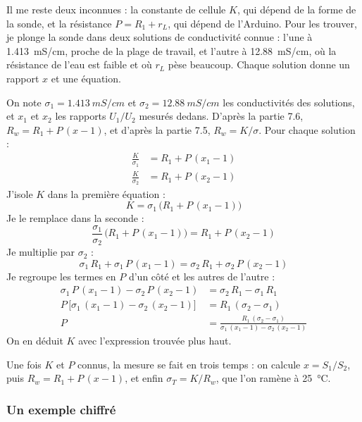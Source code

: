 Il me reste deux inconnues : la constante de cellule $K$, qui dépend de la forme de la sonde, et la résistance $P = R_1 + r_L$, qui dépend de l'Arduino. Pour les trouver, je plonge la sonde dans deux solutions de conductivité connue : l'une à \qty{1,413}{mS/cm}, proche de la plage de travail, et l'autre à \qty{12,88}{mS/cm}, où la résistance de l'eau est faible et où $r_L$ pèse beaucoup. Chaque solution donne un rapport $x$ et une équation.

\begin{demonstration}
On note $\sigma_1 = \qty{1,413}{mS/cm}$ et $\sigma_2 = \qty{12,88}{mS/cm}$ les conductivités des solutions, et $x_1$ et $x_2$ les rapports $U_1/U_2$ mesurés dedans. D'après la partie 7.6, $R_w = R_1 + P\,(x - 1)$, et d'après la partie 7.5, $R_w = K/\sigma$. Pour chaque solution :
\begin{align*}
\frac{K}{\sigma_1} &= R_1 + P\,(x_1 - 1)\\
\frac{K}{\sigma_2} &= R_1 + P\,(x_2 - 1)
\end{align*}
J'isole $K$ dans la première équation :
\[
K = \sigma_1\,\bigl(R_1 + P\,(x_1 - 1)\bigr)
\]
Je le remplace dans la seconde :
\[
\frac{\sigma_1}{\sigma_2}\,\bigl(R_1 + P\,(x_1 - 1)\bigr) = R_1 + P\,(x_2 - 1)
\]
Je multiplie par $\sigma_2$ :
\[
\sigma_1\,R_1 + \sigma_1\,P\,(x_1 - 1) = \sigma_2\,R_1 + \sigma_2\,P\,(x_2 - 1)
\]
Je regroupe les termes en $P$ d'un côté et les autres de l'autre :
\begin{align*}
\sigma_1\,P\,(x_1 - 1) - \sigma_2\,P\,(x_2 - 1) &= \sigma_2\,R_1 - \sigma_1\,R_1\\
P\,\bigl[\sigma_1\,(x_1 - 1) - \sigma_2\,(x_2 - 1)\bigr] &= R_1\,(\sigma_2 - \sigma_1)\\
P &= \frac{R_1\,(\sigma_2 - \sigma_1)}{\sigma_1\,(x_1 - 1) - \sigma_2\,(x_2 - 1)}
\end{align*}
On en déduit $K$ avec l'expression trouvée plus haut.
\end{demonstration}

Une fois $K$ et $P$ connus, la mesure se fait en trois temps : on calcule $x = S_1/S_2$, puis $R_w = R_1 + P\,(x - 1)$, et enfin $\sigma_T = K/R_w$, que l'on ramène à \qty{25}{\celsius}.

\subsubsection*{Un exemple chiffré}

